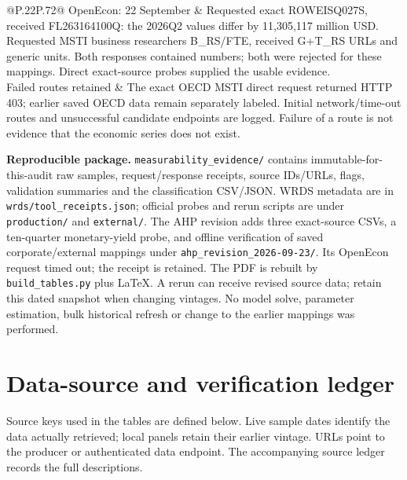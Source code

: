 \documentclass[10pt,a4paper,landscape]{article}
\newcommand{\code}[1]{{\footnotesize\texttt{#1}}}
\begin{document}
\begin{longtable}{@{}P{.22\textwidth}P{.72\textwidth}@{}}
OpenEcon: 22 September & Requested exact ROWEISQ027S, received FL263164100Q: the 2026Q2 values differ by 11,305,117 million USD. Requested MSTI business researchers B\_RS/FTE, received G+T\_RS URLs and generic units. Both responses contained numbers; both were rejected for these mappings. Direct exact-source probes supplied the usable evidence.\\[6pt]
Failed routes retained & The exact OECD MSTI direct request returned HTTP 403; earlier saved OECD data remain separately labeled. Initial network/time-out routes and unsuccessful candidate endpoints are logged. Failure of a route is not evidence that the economic series does not exist.\\
\bottomrule
\end{longtable}

\textbf{Reproducible package.} \code{measurability\_evidence/} contains immutable-for-this-audit raw samples, request/response receipts, source IDs/URLs, flags, validation summaries and the classification CSV/JSON. WRDS metadata are in \code{wrds/tool\_receipts.json}; official probes and rerun scripts are under \code{production/} and \code{external/}. The AHP revision adds three exact-source CSVs, a ten-quarter monetary-yield probe, and offline verification of saved corporate/external mappings under \code{ahp\_revision\_2026-09-23/}. Its OpenEcon request timed out; the receipt is retained. The PDF is rebuilt by \code{build\_tables.py} plus LaTeX. A rerun can receive revised source data; retain this dated snapshot when changing vintages. No model solve, parameter estimation, bulk historical refresh or change to the earlier mappings was performed.


\clearpage\section{Data-source and verification ledger}

\small Source keys used in the tables are defined below. Live sample dates identify the data actually retrieved; local panels retain their earlier vintage. URLs point to the producer or authenticated data endpoint. The accompanying source ledger records the full descriptions.
\end{document}

